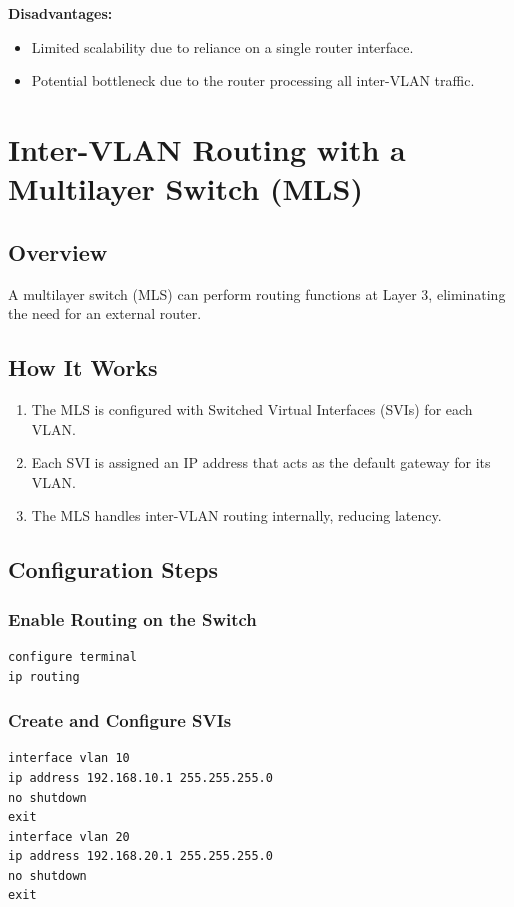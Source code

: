 \documentclass[a4paper]{book}
\begin{document}
\textbf{Disadvantages:}
\begin{itemize}
    \item Limited scalability due to reliance on a single router interface.
    \item Potential bottleneck due to the router processing all inter-VLAN traffic.
\end{itemize}

\section{Inter-VLAN Routing with a Multilayer Switch (MLS)}
\subsection{Overview}
A multilayer switch (MLS) can perform routing functions at Layer 3, eliminating the need for an external router.

\subsection{How It Works}
\begin{enumerate}
    \item The MLS is configured with Switched Virtual Interfaces (SVIs) for each VLAN.
    \item Each SVI is assigned an IP address that acts as the default gateway for its VLAN.
    \item The MLS handles inter-VLAN routing internally, reducing latency.
\end{enumerate}

\subsection{Configuration Steps}
\subsubsection{Enable Routing on the Switch}
\begin{lstlisting}
configure terminal
ip routing
\end{lstlisting}

\subsubsection{Create and Configure SVIs}
\begin{lstlisting}
interface vlan 10
ip address 192.168.10.1 255.255.255.0
no shutdown
exit
interface vlan 20
ip address 192.168.20.1 255.255.255.0
no shutdown
exit
\end{lstlisting}
\end{document}
